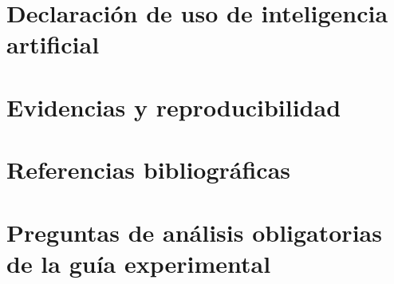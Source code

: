 \documentclass[11pt,a4paper,oneside]{article}
\newif\ifmodoBorrador
\newcommand{\pendiente}[1]{%
  \par\smallskip\noindent{\color{grisNota}\textbf{[PENDIENTE]} #1}\par\smallskip
}
\begin{document}
\section{Declaración de uso de inteligencia artificial}


\section{Evidencias y reproducibilidad}


\clearpage
\section*{Referencias bibliográficas}
\ifmodoBorrador
\pendiente{Incorporar mínimo 6 referencias reales verificadas en referencias.bib y citarlas con \texttt{\textbackslash cite\{clave\}}. Al menos dos artículos deben ser indexados, recientes y con DOI comprobado.}
\fi
\printbibliography[heading=none]

\appendix
\section{Preguntas de análisis obligatorias de la guía experimental}

\end{document}
